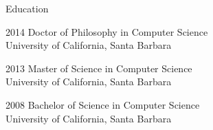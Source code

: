 \begin{vitae}
{\small

\begin{vitaesection}{Education}
\vspace{-0.1cm}
  \item [2014] Doctor of Philosophy in Computer Science\\ University of
    California, Santa Barbara
  \item [2013] Master of Science in Computer Science\\ University of
    California, Santa Barbara
  \item [2008] Bachelor of Science in Computer Science\\ University of
    California, Santa Barbara
\end{vitaesection}

}
\end{vitae}
